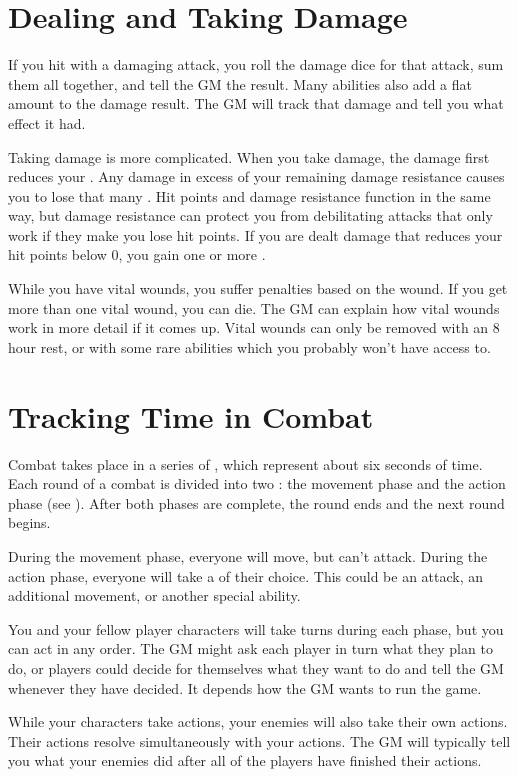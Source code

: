 \section{Dealing and Taking Damage}
  If you hit with a damaging attack, you roll the damage dice for that attack, sum them all together, and tell the GM the result.
  Many abilities also add a flat amount to the damage result.
  The GM will track that damage and tell you what effect it had.

  Taking damage is more complicated.
  When you take damage, the damage first reduces your .
  Any damage in excess of your remaining damage resistance causes you to lose that many .
  Hit points and damage resistance function in the same way, but damage resistance can protect you from debilitating attacks that only work if they make you lose hit points.
  If you are dealt damage that reduces your hit points below 0, you gain one or more .

  While you have vital wounds, you suffer penalties based on the wound.
  If you get more than one vital wound, you can die.
  The GM can explain how vital wounds work in more detail if it comes up.
  Vital wounds can only be removed with an 8 hour rest, or with some rare abilities which you probably won't have access to.

\section{Tracking Time in Combat}
  Combat takes place in a series of , which represent about six seconds of time.
  Each round of a combat is divided into two : the movement phase and the action phase (see ).
  After both phases are complete, the round ends and the next round begins.

  During the movement phase, everyone will move, but can't attack.
  During the action phase, everyone will take a  of their choice.
  This could be an attack, an additional movement, or another special ability.

  You and your fellow player characters will take turns during each phase, but you can act in any order.
  The GM might ask each player in turn what they plan to do, or players could decide for themselves what they want to do and tell the GM whenever they have decided.
  It depends how the GM wants to run the game.

  While your characters take actions, your enemies will also take their own actions.
  Their actions resolve simultaneously with your actions.
  The GM will typically tell you what your enemies did after all of the players have finished their actions.


